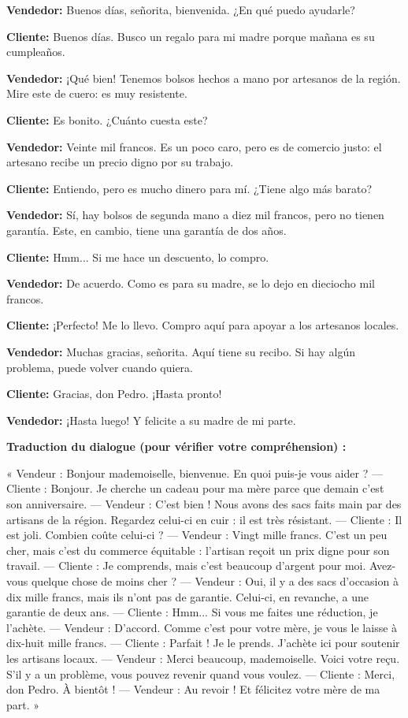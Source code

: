\documentclass[11pt]{article}
\begin{document}
\begin{textebox}
\textbf{Vendedor:} Buenos días, señorita, bienvenida. ¿En qué puedo ayudarle?\par
\textbf{Cliente:} Buenos días. Busco un regalo para mi madre porque mañana es su cumpleaños.\par
\textbf{Vendedor:} ¡Qué bien! Tenemos bolsos hechos a mano por artesanos de la región. Mire este de cuero: es muy resistente.\par
\textbf{Cliente:} Es bonito. ¿Cuánto cuesta este?\par
\textbf{Vendedor:} Veinte mil francos. Es un poco caro, pero es de comercio justo: el artesano recibe un precio digno por su trabajo.\par
\textbf{Cliente:} Entiendo, pero es mucho dinero para mí. ¿Tiene algo más barato?\par
\textbf{Vendedor:} Sí, hay bolsos de segunda mano a diez mil francos, pero no tienen garantía. Este, en cambio, tiene una garantía de dos años.\par
\textbf{Cliente:} Hmm... Si me hace un descuento, lo compro.\par
\textbf{Vendedor:} De acuerdo. Como es para su madre, se lo dejo en dieciocho mil francos.\par
\textbf{Cliente:} ¡Perfecto! Me lo llevo. Compro aquí para apoyar a los artesanos locales.\par
\textbf{Vendedor:} Muchas gracias, señorita. Aquí tiene su recibo. Si hay algún problema, puede volver cuando quiera.\par
\textbf{Cliente:} Gracias, don Pedro. ¡Hasta pronto!\par
\textbf{Vendedor:} ¡Hasta luego! Y felicite a su madre de mi parte.
\end{textebox}

\textbf{Traduction du dialogue (pour vérifier votre compréhension) :}

« Vendeur : Bonjour mademoiselle, bienvenue. En quoi puis-je vous aider ? — Cliente : Bonjour. Je cherche un cadeau pour ma mère parce que demain c'est son anniversaire. — Vendeur : C'est bien ! Nous avons des sacs faits main par des artisans de la région. Regardez celui-ci en cuir : il est très résistant. — Cliente : Il est joli. Combien coûte celui-ci ? — Vendeur : Vingt mille francs. C'est un peu cher, mais c'est du commerce équitable : l'artisan reçoit un prix digne pour son travail. — Cliente : Je comprends, mais c'est beaucoup d'argent pour moi. Avez-vous quelque chose de moins cher ? — Vendeur : Oui, il y a des sacs d'occasion à dix mille francs, mais ils n'ont pas de garantie. Celui-ci, en revanche, a une garantie de deux ans. — Cliente : Hmm... Si vous me faites une réduction, je l'achète. — Vendeur : D'accord. Comme c'est pour votre mère, je vous le laisse à dix-huit mille francs. — Cliente : Parfait ! Je le prends. J'achète ici pour soutenir les artisans locaux. — Vendeur : Merci beaucoup, mademoiselle. Voici votre reçu. S'il y a un problème, vous pouvez revenir quand vous voulez. — Cliente : Merci, don Pedro. À bientôt ! — Vendeur : Au revoir ! Et félicitez votre mère de ma part. »
\end{document}
